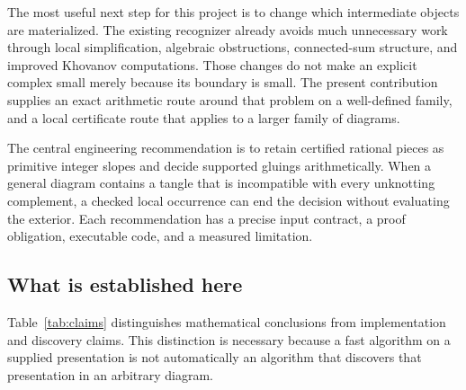 \documentclass[11pt,a4paper]{article}
\theoremstyle{definition}
\theoremstyle{remark}
\numberwithin{equation}{section}
\begin{document}
The most useful next step for this project is to change which intermediate
objects are materialized. The existing recognizer already avoids much
unnecessary work through local simplification, algebraic obstructions,
connected-sum structure, and improved Khovanov computations. Those changes
do not make an explicit complex small merely because its boundary is small.
The present contribution supplies an exact arithmetic route around that
problem on a well-defined family, and a local certificate route that applies
to a larger family of diagrams.

The central engineering recommendation is to retain certified rational
pieces as primitive integer slopes and decide supported gluings arithmetically.
When a general diagram contains a tangle that is incompatible with every
unknotting complement, a checked local occurrence can end the decision
without evaluating the exterior. Each recommendation has a precise input
contract, a proof obligation, executable code, and a measured limitation.

\subsection{What is established here}

Table~\ref{tab:claims} distinguishes mathematical conclusions from
implementation and discovery claims. This distinction is necessary because
a fast algorithm on a supplied presentation is not automatically an algorithm
that discovers that presentation in an arbitrary diagram.
\end{document}
